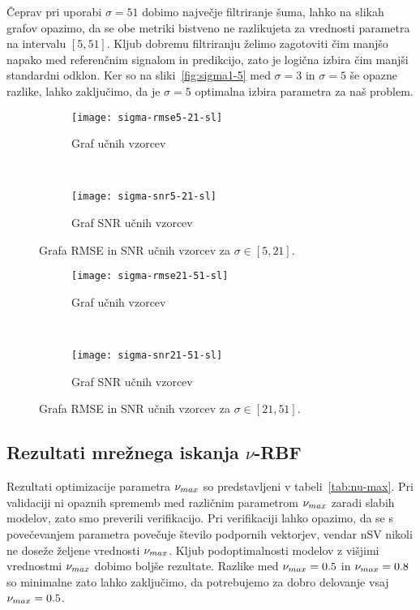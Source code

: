 Čeprav pri uporabi $\sigma=51$ dobimo največje filtriranje šuma, lahko na slikah grafov opazimo, da se obe metriki bistveno ne razlikujeta za vrednosti parametra na intervalu $[5,51]$. Kljub dobremu filtriranju želimo zagotoviti čim manjšo napako med referenčnim signalom in predikcijo, zato je logična izbira čim manjši standardni odklon. Ker so na sliki~\ref{fig:sigma1-5} med $\sigma=3$ in $\sigma=5$ še opazne razlike, lahko zaključimo, da je $\sigma=5$ optimalna izbira parametra za naš problem. 


\begin{figure}[!htb]
	\centering
	\begin{subfigure}[t]{0.45\columnwidth}
		\texttt{[image: sigma-rmse5-21-sl]}
		\caption{Graf \rmse  učnih vzorcev}
		\label{fig:sigma-rmse5-21}
	\end{subfigure}
	~
	\begin{subfigure}[t]{0.45\columnwidth}
		\texttt{[image: sigma-snr5-21-sl]}
		\caption{Graf SNR  učnih vzorcev}
		\label{fig:sigma-snr5-21}
	\end{subfigure}
	\caption[Grafa \rmse in SNR učnih vzorcev za \mbox{$\sigma \in [5,21]$}]{Grafa RMSE in SNR učnih vzorcev za \mbox{$\sigma \in [5,21]$}.}
	\label{fig:sigma5-21}
\end{figure}



\begin{figure}[!htb]
	\centering
	\begin{subfigure}[t]{0.45\columnwidth}
		\texttt{[image: sigma-rmse21-51-sl]}
		\caption{Graf \rmse učnih vzorcev}
		\label{fig:sigma-rmse21-51}
	\end{subfigure}
	~
	\begin{subfigure}[t]{0.45\columnwidth}
		\texttt{[image: sigma-snr21-51-sl]}
		\caption{Graf SNR  učnih vzorcev}
		\label{fig:sigma-snr21-51}
	\end{subfigure}
	\caption[Grafa \rmse in SNR učnih vzorcev za \mbox{$\sigma \in [21,51]$}]{Grafa RMSE in SNR učnih vzorcev za \mbox{$\sigma \in [21,51]$}.}
	\label{fig:sigma21-51}
\end{figure}


\subsection{Rezultati mrežnega iskanja \texorpdfstring{$\nu$}{nu}-RBF}
Rezultati optimizacije parametra $\nu_{max}$ so predstavljeni v tabeli~\ref{tab:nu-max}. Pri validaciji ni opaznih sprememb med različnim parametrom $\nu_{max}$ zaradi slabih modelov, zato smo preverili verifikacijo. Pri verifikaciji lahko opazimo, da se s povečevanjem parametra povečuje število podpornih vektorjev, vendar nSV nikoli ne doseže željene vrednosti $\nu_{max}$. Kljub podoptimalnosti modelov z višjimi vrednostmi $\nu_{max}$ dobimo boljše rezultate. Razlike med $\nu_{max}=\num{0.5}$ in $\nu_{max}=\num{0.8}$ so minimalne zato lahko zaključimo, da potrebujemo za dobro delovanje vsaj $\nu_{max}=\num{0.5}$. 

